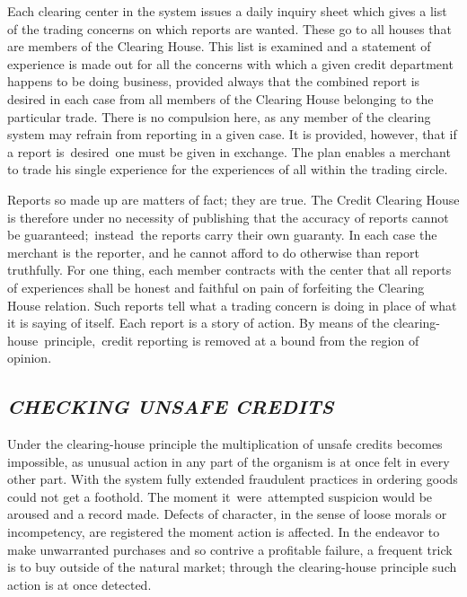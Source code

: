 \documentclass[openany,nobib]{tufte-book}
\begin{document}
Each clearing center in the system issues a daily inquiry sheet which
gives a list of the trading concerns on which reports are wanted. These
go to all houses that are members of the Clearing House. This list is
examined and a statement of experience is made out for all the concerns
with which a given credit department happens to be doing business,
provided always that the combined report is desired in each case from
all members of the Clearing House belonging to the particular trade.
There is no compulsion here, as any member of the clearing system may
refrain from reporting in a given case. It is provided, however, that if
a report is~desired~one must be given in exchange. The plan enables a
merchant to trade his single experience for the experiences of all
within the trading circle.~

Reports so made up are matters of fact; they are true. The Credit
Clearing House is therefore under no necessity of publishing that the
accuracy of reports cannot be guaranteed;~instead~the reports carry
their own guaranty. In each case the merchant is the reporter, and he
cannot afford to do otherwise than report truthfully. For one thing,
each member contracts with the center that all reports of experiences
shall be honest and faithful on pain of forfeiting the Clearing House
relation. Such reports tell what a trading concern is doing in place of
what it is saying of itself. Each report is a story of action. By means
of the clearing-house~principle,~credit reporting is removed at a bound
from the region of opinion.~

\hypertarget{checking-unsafe-credits}{%
\subsection{\texorpdfstring{\emph{CHECKING UNSAFE
CREDITS}}{CHECKING UNSAFE CREDITS}}\label{checking-unsafe-credits}}

Under the clearing-house principle the multiplication of unsafe credits
becomes impossible, as unusual action in any part of the organism is at
once felt in every other part. With the system fully extended fraudulent
practices in ordering goods could not get a foothold. The moment
it~were~attempted suspicion would be aroused and a record made. Defects
of character, in the sense of loose morals or incompetency, are
registered the moment action is affected. In the endeavor to make
unwarranted purchases and so contrive a profitable failure, a frequent
trick is to buy outside of the natural market; through the
clearing-house principle such action is at once detected.~
\end{document}
